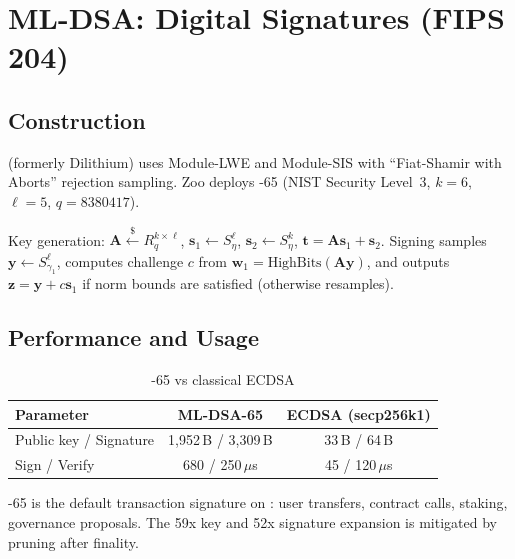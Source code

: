 \section{ML-DSA: Digital Signatures (FIPS 204)}


\subsection{Construction}

\MLDSA{} (formerly Dilithium) uses Module-LWE and Module-SIS with ``Fiat-Shamir with Aborts'' rejection sampling. Zoo deploys \MLDSA{}-65 (NIST Security Level~3, $k = 6$, $\ell = 5$, $q = 8380417$).

Key generation: $\mathbf{A} \xleftarrow{\$} R_q^{k \times \ell}$, $\mathbf{s}_1 \leftarrow S_\eta^\ell$, $\mathbf{s}_2 \leftarrow S_\eta^k$, $\mathbf{t} = \mathbf{A}\mathbf{s}_1 + \mathbf{s}_2$. Signing samples $\mathbf{y} \leftarrow S_{\gamma_1}^\ell$, computes challenge $c$ from $\mathbf{w}_1 = \text{HighBits}(\mathbf{A}\mathbf{y})$, and outputs $\mathbf{z} = \mathbf{y} + c\mathbf{s}_1$ if norm bounds are satisfied (otherwise resamples).

\subsection{Performance and Usage}

\begin{table}[h]
\centering
\begin{tabular}{lcc}
\toprule
\textbf{Parameter} & \textbf{ML-DSA-65} & \textbf{ECDSA (secp256k1)} \\
\midrule
Public key / Signature & 1,952\,B / 3,309\,B & 33\,B / 64\,B \\
Sign / Verify & 680 / 250\,$\mu$s & 45 / 120\,$\mu$s \\
\bottomrule
\end{tabular}
\caption{\MLDSA{}-65 vs classical ECDSA}
\label{tab:mldsa-perf}
\end{table}

\MLDSA{}-65 is the default transaction signature on \KChain{}: user transfers, contract calls, staking, governance proposals. The 59x key and 52x signature expansion is mitigated by pruning after finality.

